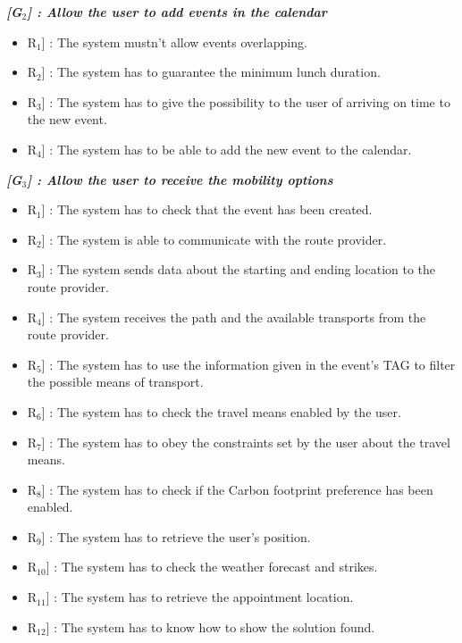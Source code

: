 \vspace{0.5cm}
\noindent
\emph{\textbf{[G$_{2}$] : Allow the user to add events in the calendar}}
\begin{itemize}
	\setlength{\leftskip}{0.5cm}
	\item \lbrack R$_{1}$] : The system mustn’t allow events overlapping.
	\item \lbrack R$_{2}$] : The system has to guarantee the minimum lunch duration.
	\item \lbrack R$_{3}$] : The system has to give the possibility to the user of arriving on time to the new event.
	\item \lbrack R$_{4}$] : The system has to be able to add the new event to the calendar.
\end{itemize}

\vspace{0.5cm}
\noindent
\emph{\textbf{[G$_{3}$] : Allow the user to receive the mobility options}}
\begin{itemize}
	\setlength{\leftskip}{0.5cm}
	\item \lbrack R$_{1}$] : The system has to check that the event has been created.
	\item \lbrack R$_{2}$] : The system is able to communicate with the route provider.
	\item \lbrack R$_{3}$] : The system sends data about the starting and ending location to the route provider.
	\item \lbrack R$_{4}$] : The system receives the path and the available transports from the route provider.
	\item \lbrack R$_{5}$] : The system has to use the information given in the event’s TAG to filter the possible means of transport.
	\item \lbrack R$_{6}$] : The system has to check the travel means enabled by the user.
	\item \lbrack R$_{7}$] : The system has to obey the constraints set by the user about the travel means.
	\item \lbrack R$_{8}$] : The system has to check if the Carbon footprint preference has been enabled.
	\item \lbrack R$_{9}$] : The system has to retrieve the user's position.
	\item \lbrack R$_{10}$] : The system has to check the weather forecast and strikes.
	\item \lbrack R$_{11}$] : The system has to retrieve the appointment location.
	\item \lbrack R$_{12}$] : The system has to know how to show the solution found.
\end{itemize}

